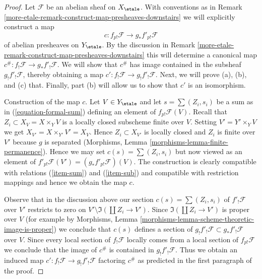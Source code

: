\begin{proof}
Let $\mathcal{F}$ be an abelian sheaf on $X_\etale$. With conventions as in
Remark \ref{more-etale-remark-construct-map-presheaves-downstairs} we will explicitly
construct a map
$$
c : f_{p!}\mathcal{F} \longrightarrow g_*f'_{p!}\mathcal{F}
$$
of abelian presheaves on $Y_\etale$. By the discussion in
Remark \ref{more-etale-remark-construct-map-presheaves-downstairs}
this will determine a canonical map
$c^\# : f_!\mathcal{F} \to g_*f'_!\mathcal{F}$.
We will show that $c^\#$ has image contained in the subsheaf
$g_!f'_!\mathcal{F}$, thereby obtaining a map
$c' : f_!\mathcal{F} \to g_!f'_!\mathcal{F}$. Next, we will prove
(a), (b), and (c) that. Finally, part (b)
will allow us to show that $c'$ is an isomorphism.

\medskip\noindent
Construction of the map $c$. Let $V \in Y_\etale$ and
let $s = \sum (Z_i, s_i)$ be a sum as in (\ref{equation-formal-sum})
defining an element of $f_{p!}\mathcal{F}(V)$.
Recall that $Z_i \subset X_V = X \times_Y V$
is a locally closed subscheme finite over $V$.
Setting $V' = Y' \times_Y V$ we get $X_{V'} = X \times_{Y'} V' = X_V$.
Hence $Z_i \subset X_{V'}$ is locally closed and
$Z_i$ is finite over $V'$ because $g$ is separated
(Morphisms, Lemma \ref{morphisms-lemma-finite-permanence}).
Hence we may set $c(s) = \sum (Z_i, s_i)$ but now viewed
as an element of $f'_{p!}\mathcal{F}(V') = (g_*f'_{p!}\mathcal{F})(V)$.
The construction is clearly compatible with relations
(\ref{item-sum}) and (\ref{item-sub})
and compatible with restriction mappings and hence we obtain the map $c$.

\medskip\noindent
Observe that in the discussion above our section $c(s) = \sum (Z_i, s_i)$ of
$f'_!\mathcal{F}$ over $V'$ restricts to zero on
$V' \setminus \Im(\coprod Z_i \to V')$. Since $\Im(\coprod Z_i \to V')$
is proper over $V$ (for example by Morphisms, Lemma
\ref{morphisms-lemma-scheme-theoretic-image-is-proper})
we conclude that $c(s)$ defines a section of
$g_!f'_!\mathcal{F} \subset g_*f'_!\mathcal{F}$ over $V$.
Since every local section of $f_!\mathcal{F}$ locally comes from a
local section of $f_{p!}\mathcal{F}$ we conclude that the image
of $c^\#$ is contained in $g_!f'_!\mathcal{F}$.
Thus we obtain an induced map $c' : f_!\mathcal{F} \to g_!f'_!\mathcal{F}$
factoring $c^\#$ as predicted in the first paragraph of the proof.


\end{proof}
